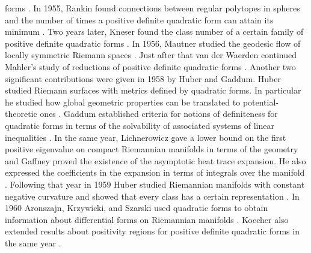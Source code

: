 \documentclass{amsart}
\theoremstyle{definition}
\begin{document}
forms \cite{MR0067162}. In 1955, Rankin found connections between regular polytopes in spheres and the number of times a positive definite quadratic form can attain its minimum \cite{MR0074013}. Two years later, Kneser found the class number of a certain family of positive definite quadratic forms \cite{MR0090606}. In 1956, Mautner studied the geodesic flow of locally symmetric Riemann spaces \cite{mautner1957geodesic}. Just after that van der Waerden continued Mahler's \cite{mahler1940reduced} study of reductions of positive definite quadratic forms \cite{van1956reduktionstheorie}. Another two significant contributions were given in 1958 by Huber and Gaddum. Huber studied Riemann surfaces with metrics defined by quadratic forms. In particular he studied how global geometric properties can be translated to potential-theoretic ones \cite{huber1958subharmonic}. Gaddum established criteria for notions of definiteness for quadratic forms in terms of the solvability of associated systems of linear inequalities \cite{MR0101506}. In the same year, Lichnerowicz gave a lower bound on the first positive eigenvalue on compact Riemannian manifolds in terms of the geometry \cite{lichnerowicz1958geometrie} and Gaffney proved the existence of the asymptotic heat trace expansion. He also expressed the coefficients in the expansion in terms of integrals over the manifold \cite{gaffney1958asymptotic}. Following that year in 1959 Huber studied Riemannian manifolds with constant negative curvature and showed that every class has a certain representation \cite{huber1959analytischen}. In 1960 Aronszajn, Krzywicki, and Szarski used quadratic forms to obtain information about differential forms on Riemannian manifolds \cite{aronszajn1960unique}. Koecher also extended results about positivity regions for positive definite quadratic forms in the same year \cite{MR0124527}. 
\end{document}
